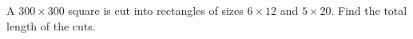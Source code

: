 A $300\times300$ square is cut into rectangles of sizes $6\times12$ and $5\times20$. Find the total length of the cuts.
